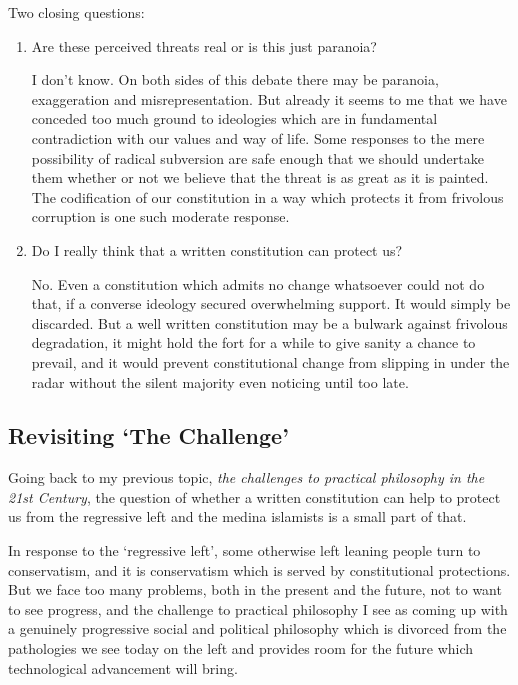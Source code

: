\documentclass[14pt,titlepage]{extarticle}
\begin{document}
Two closing questions:

\begin{enumerate}
\item Are these perceived threats real or is this just paranoia?

  I don't know.
  On both sides of this debate there may be paranoia, exaggeration and misrepresentation.
  But already it seems to me that we have conceded too much ground to ideologies which are in fundamental contradiction with our values and way of life.
  Some responses to the mere possibility of radical subversion are safe enough that we should undertake them whether or not we believe that the threat is as great as it is painted.
  The codification of our constitution in a way which protects it from frivolous corruption is one such moderate response.

\item Do I really think that a written constitution can protect us?

  No.
  Even a constitution which admits no change whatsoever could not do that, if a converse ideology secured overwhelming support.
  It would simply be discarded.
  But a well written constitution may be a bulwark against frivolous degradation, it might hold the fort for a while to give sanity a chance to prevail, and it would prevent constitutional change from slipping in under the radar without the silent majority even noticing until too late.
\end{enumerate}

\subsection{Revisiting `The Challenge'}

Going back to my previous topic, {\it the challenges to practical philosophy in the 21st Century}, the question of whether a written constitution can help to protect us from the regressive left and the medina islamists is a small part of that.

In response to the `regressive left', some otherwise left leaning people turn to conservatism, and it is conservatism which is served by constitutional protections.
But we face too many problems, both in the present and the future, not to want to see progress, and the challenge to practical philosophy I see as coming up with a genuinely progressive social and political philosophy which is divorced from the pathologies we see today on the left and provides room for the future which technological advancement will bring.
\end{document}
